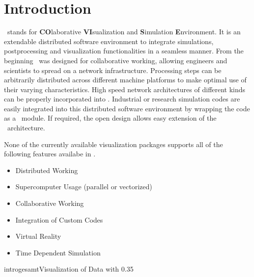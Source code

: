 
\begin{htmlonly}
 



\end{htmlonly}


\startdocument
\chapter{Introduction}
\label{Introduction}

\covise\ stands for {\bf CO}laborative {\bf VI}sualization and {\bf S}imulation {\bf E}nvironment. 
It is an extendable distributed software environment to integrate simulations, postprocessing and 
visualization functionalities in a seamless manner. From the beginning \covise\ was designed for 
collaborative working, allowing engineers and
scientists to spread on a network infrastructure. Processing steps can be arbitrarily distributed across 
different machine platforms to make optimal use of their varying characteristics. High 
speed network architectures of different kinds can be properly incorporated into 
\covise. Industrial or research simulation codes are easily integrated into this distributed 
software environment by wrapping the code as a
\covise\ module. If required, the open design allows easy extension of the \covise\ architecture. 
    
None of the currently available visualization packages supports all of the following features 
availabe in \covise.

\begin{itemize}
\item Distributed Working

\item Supercomputer Usage (parallel or vectorized)

\item Collaborative Working

\item Integration of Custom Codes

\item Virtual Reality 

\item Time Dependent Simulation
\end{itemize}

\begin{covimg}{intro}{gesamt}{Visualization of Data with \covise}{0.35}\end{covimg}


